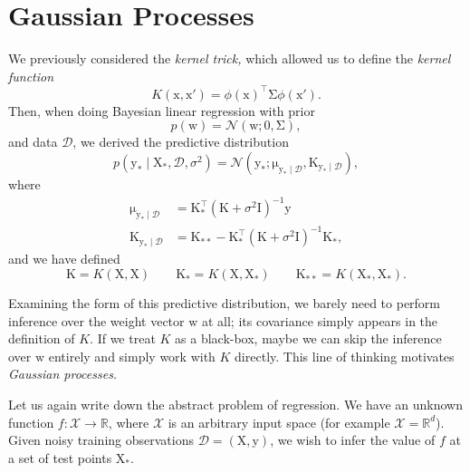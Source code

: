 \documentclass{article}
\newcommand{\given}{\mid}
\newcommand{\mc}[1]{\mathcal{#1}}
\newcommand{\data}{\mc{D}}
\newcommand{\inv}{^{-1}}
\newcommand{\trans}{^\top}
\newcommand{\mat}[1]{\bm{\mathrm{#1}}}
\renewcommand{\vec}[1]{\bm{\mathrm{#1}}}
\newcommand{\R}{\mathbb{R}}
\begin{document}
\section*{Gaussian Processes}

We previously considered the \emph{kernel trick,} which allowed
us to define the \emph{kernel function}
\begin{equation*}
  K(\vec{x}, \vec{x}')
  =
  \phi(\vec{x})\trans\mat{\Sigma}\phi(\vec{x}').
\end{equation*}
Then, when doing Bayesian linear regression with prior
\begin{equation*}
  p(\vec{w}) = \mc{N}(\vec{w}; \vec{0}, \mat{\Sigma}),
\end{equation*}
and data $\data$, we derived the predictive distribution
\begin{equation*}
  p(\vec{y}_\ast \given \mat{X}_\ast, \data, \sigma^2)
  =
  \mc{N}(
  \vec{y}_\ast;
  \vec{\mu}_{\vec{y}_\ast \given \data},
  \mat{K}_{\vec{y}_\ast \given \data}),
\end{equation*}
where
\begin{align*}
  \vec{\mu}_{\vec{y}_\ast \given \data}
  &=
  \mat{K}_\ast\trans
  (\mat{K} + \sigma^2\mat{I})\inv
  \vec{y}
  \\
  \mat{K}_{\vec{y}_\ast \given \data}
  &=
  \mat{K}_{\ast\ast}
  -
  \mat{K}_\ast\trans
  (\mat{K} + \sigma^2\mat{I})\inv
  \mat{K}_\ast,
\end{align*}
and we have defined
\begin{equation*}
  \mat{K} = K(\mat{X}, \mat{X})
  \qquad
  \mat{K}_\ast = K(\mat{X}, \mat{X}_\ast)
  \qquad
  \mat{K}_{\ast\ast} = K(\mat{X}_\ast, \mat{X}_\ast).
\end{equation*}

Examining the form of this predictive distribution, we barely need to
perform inference over the weight vector $\vec{w}$ at all; its
covariance simply appears in the definition of $K$.  If we treat $K$
as a black-box, maybe we can skip the inference over $\vec{w}$
entirely and simply work with $K$ directly.  This line of thinking
motivates \emph{Gaussian processes.}

Let us again write down the abstract problem of regression.  We have
an unknown function $f\colon \mc{X} \to \R$, where $\mc{X}$ is an
arbitrary input space (for example $\mc{X} = \R^d$).  Given noisy
training observations $\data = (\mat{X}, \vec{y})$, we wish to infer
the value of $f$ at a set of test points $\mat{X}_\ast$.
\end{document}
